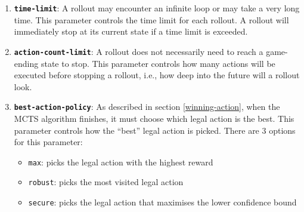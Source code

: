 \begin{enumerate}
  \item \textbf{\texttt{time-limit}}: A rollout may encounter an infinite loop or may take a very long time. This parameter controls the time limit for each rollout. A rollout will immediately stop at its current state if a time limit is exceeded. %
  \item \textbf{\texttt{action-count-limit}}: A rollout does not necessarily need to reach a game-ending state to stop. This parameter controls how many actions will be executed before stopping a rollout, i.e., how deep into the future will a rollout look.
  \item \textbf{\texttt{best-action-policy}}: As described in section \ref{winning-action}, when the MCTS algorithm finishes, it must choose which legal action is the best. This parameter controls how the ``best'' legal action is picked. There are 3 options for this parameter:
  \begin{itemize}
    \item \texttt{max}: picks the legal action with the highest reward
    \item \texttt{robust}: picks the most visited legal action
    \item \texttt{secure}: picks the legal action that maximises the lower confidence bound
  \end{itemize}
\end{enumerate}





